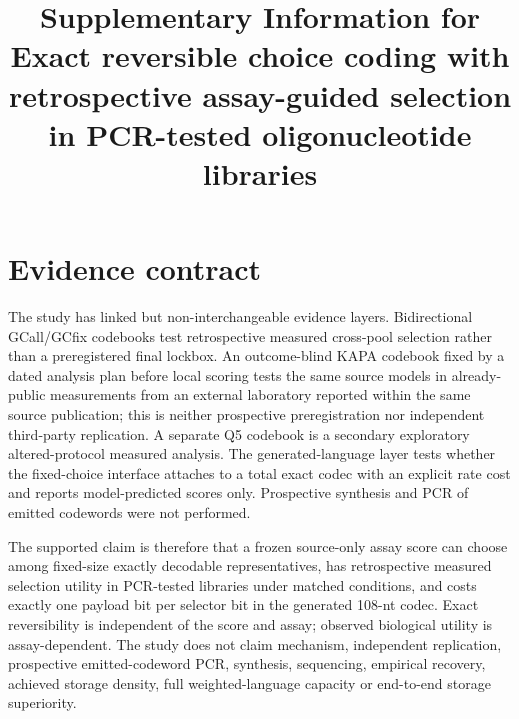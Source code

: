 \documentclass[10pt]{article}
\title{Supplementary Information for\\Exact reversible choice coding with retrospective assay-guided selection in PCR-tested oligonucleotide libraries}
\author{}
\date{}
\begin{document}
\maketitle

\section{Evidence contract}

The study has linked but non-interchangeable evidence layers. Bidirectional GCall/GCfix codebooks test retrospective measured cross-pool selection rather than a preregistered final lockbox. An outcome-blind KAPA codebook fixed by a dated analysis plan before local scoring tests the same source models in already-public measurements from an external laboratory reported within the same source publication; this is neither prospective preregistration nor independent third-party replication. A separate Q5 codebook is a secondary exploratory altered-protocol measured analysis. The generated-language layer tests whether the fixed-choice interface attaches to a total exact codec with an explicit rate cost and reports model-predicted scores only. Prospective synthesis and PCR of emitted codewords were not performed.

The supported claim is therefore that a frozen source-only assay score can choose among fixed-size exactly decodable representatives, has retrospective measured selection utility in PCR-tested libraries under matched conditions, and costs exactly one payload bit per selector bit in the generated 108-nt codec. Exact reversibility is independent of the score and assay; observed biological utility is assay-dependent. The study does not claim mechanism, independent replication, prospective emitted-codeword PCR, synthesis, sequencing, empirical recovery, achieved storage density, full weighted-language capacity or end-to-end storage superiority.
\end{document}
